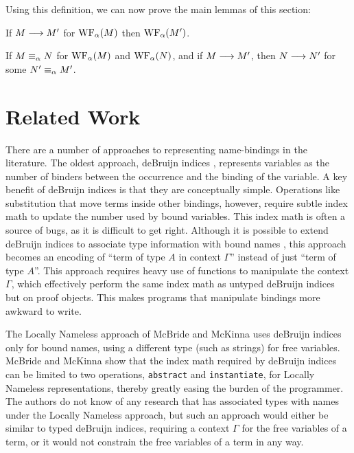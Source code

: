 \documentclass[natbib]{sigplanconf}
\begin{document}
Using this definition, we can now prove the main lemmas of this
section:

\begin{lemma}
  If $M\longrightarrow M'$ for $\mathrm{WF}_\alpha(M)$ then $\mathrm{WF}_\alpha(M')$.
\end{lemma}

\begin{lemma}
  If $M\equiv_{\alpha} N$ for $\mathrm{WF}_\alpha(M)$ and $\mathrm{WF}_\alpha(N)$, and if $M\longrightarrow M'$,
  then $N\longrightarrow N'$ for some $N'\equiv_{\alpha} M'$.
\end{lemma}


\section{Related Work}
\label{sec:related-work}

There are a number of approaches to representing name-bindings in the
literature. The oldest approach, deBruijn indices \cite{debruijn72},
represents variables as the number of binders between the occurrence
and the binding of the variable. A key benefit of deBruijn indices is
that they are conceptually simple. Operations like substitution that
move terms inside other bindings, however, require subtle index math
to update the number used by bound variables. This index math is often
a source of bugs, as it is difficult to get right.  Although it is
possible to extend deBruijn indices to associate type information with
bound names \cite{sheard05,atkey09}, this approach becomes an encoding
of ``term of type $A$ in context $\Gamma$'' instead of just ``term of
type $A$''. This approach requires heavy use of functions to
manipulate the context $\Gamma$, which effectively perform the same
index math as untyped deBruijn indices but on proof objects.  This
makes programs that manipulate bindings more awkward to write.

The Locally Nameless approach of McBride and McKinna \cite{mcbride04}
uses deBruijn indices only for bound names, using a different type
(such as strings) for free variables. McBride and McKinna show that
the index math required by deBruijn indices can be limited to two
operations, \lstinline{abstract} and \lstinline{instantiate}, for
Locally Nameless representations, thereby greatly easing the burden of
the programmer. The authors do not know of any research that has
associated types with names under the Locally Nameless approach, but
such an approach would either be similar to typed deBruijn indices,
requiring a context $\Gamma$ for the free variables of a term, or it
would not constrain the free variables of a term in any way.
\end{document}
